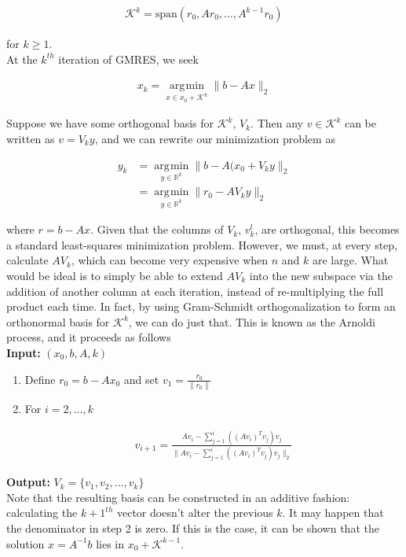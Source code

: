 \documentclass[11pt]{article}
\newcommand{\K}[1]{\mathcal{K}^{#1}}
\newcommand{\Kk}{\mathcal{K}^k}
\DeclareMathOperator*{\argmin}{\arg\!\min}
\begin{document}
\begin{align*}
  \mathcal{K}^k = \textrm{span}(r_0, Ar_0, \hdots, A^{k-1}r_0)
\end{align*}

for $k \geq 1$. \\

At the $k^{th}$ iteration of GMRES, we seek

\begin{align*}
  x_k = \argmin \limits_{x \in x_0 + \Kk} \| b - Ax \|_2
\end{align*}

Suppose we have some orthogonal basis for $\Kk$, $V_k$. Then any $v \in \Kk$ can be written as $v = V_k y$, and we can rewrite our minimization problem as

\begin{align*}
  y_k &= \argmin \limits_{y \in \mathbb{R}^k} \| b - A(x_0 + V_k y \|_2 \\
  &= \argmin \limits_{y \in \mathbb{R}^k} \| r_0 - A V_k y\|_2
\end{align*}

where $r = b - Ax$. Given that the columns of $V_k$, $v_k^l$, are orthogonal, this becomes a standard least-squares minimization problem. However, we must, at every step, calculate $A V_k$, which can become very expensive when $n$ and $k$ are large. What would be ideal is to simply be able to extend $A V_k$ into the new subspace via the addition of another column at each iteration, instead of re-multiplying the full product each time. In fact, by using Gram-Schmidt orthogonalization to form an orthonormal basis for $\Kk$, we can do just that. This is known as the Arnoldi process, and it proceeds as follows \\

\textbf{Input:} $(x_0, b, A, k)$
\begin{enumerate}
\item Define $r_0 = b - A x_0$ and set $v_1 = \frac{r_0}{\|r_0\|}$
\item For $i = 2, \dots, k$

\begin{align*}
  v_{i+1} = \frac{A v_i - \sum \limits_{j=1}^i ((A v_i)^T v_j) v_j}{\| A v_i - \sum \limits_{j=1}^i ((A v_i)^T v_j) v_j \|_2}
\end{align*}

\end{enumerate}
\textbf{Output:} $V_k = \{v_1, v_2, \dots, v_k\}$ \\

Note that the resulting basis can be constructed in an additive fashion: calculating the $k+1^{th}$ vector doesn't alter the previous $k$. It may happen that the denominator in step 2 is zero. If this is the case, it can be shown that the solution $x = A^{-1}b$ lies in $x_0 + \K{k-1}$. \\
\end{document}
